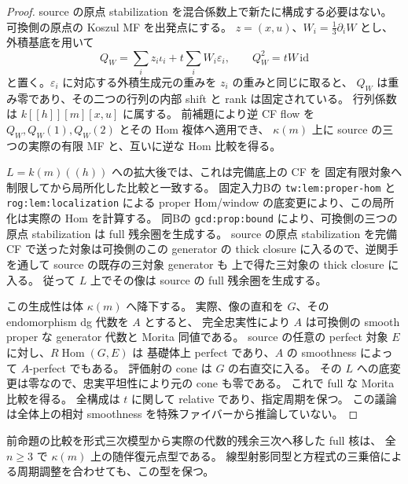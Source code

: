 \begin{proof}
source の原点 stabilization を混合係数上で新たに構成する必要はない。
可換側の原点の Koszul MF を出発点にする。
$z=(x,u)$、$W_i=\frac13\partial_iW$ とし、外積基底を用いて
\[
 Q_W=\sum_i z_i\iota_i+t\sum_i W_i\varepsilon_i,
 \qquad Q_W^2=tW\,\mathrm{id}
\]
と置く。$\varepsilon_i$ に対応する外積生成元の重みを $z_i$ の重みと同じに取ると、
$Q_W$ は重み零であり、その二つの行列の内部 shift と rank は固定されている。
行列係数は $k[[h]][m][x,u]$ に属する。
前補題により逆 CF flow を $Q_W,Q_W(1),Q_W(2)$ とその Hom 複体へ適用でき、
$\kappa(m)$ 上に source の三つの実際の有限 MF と、互いに逆な Hom 比較を得る。

$L=k(m)((h))$ への拡大後では、これは完備底上の CF を
固定有限対象へ制限してから局所化した比較と一致する。
固定入力Bの \texttt{tw:lem:proper-hom} と \texttt{rog:lem:localization} による
proper Hom/window の底変更により、この局所化は実際の Hom を計算する。
同Bの \texttt{gcd:prop:bound} により、可換側の三つの原点 stabilization は
full 残余圏を生成する。
source の原点 stabilization を完備 CF で送った対象は可換側のこの generator の
thick closure に入るので、逆関手を通して source の既存の三対象 generator も
上で得た三対象の thick closure に入る。
従って $L$ 上でその像は source の full 残余圏を生成する。

この生成性は体 $\kappa(m)$ へ降下する。
実際、像の直和を $G$、その endomorphism dg 代数を $A$ とすると、
完全忠実性により $A$ は可換側の smooth proper な generator 代数と Morita 同値である。
source の任意の perfect 対象 $E$ に対し、$R\operatorname{Hom}(G,E)$ は
基礎体上 perfect であり、$A$ の smoothness によって $A$-perfect でもある。
評価射の cone は $G$ の右直交に入る。
その $L$ への底変更は零なので、忠実平坦性により元の cone も零である。
これで full な Morita 比較を得る。
全構成は $t$ に関して relative であり、指定周期を保つ。
この議論は全体上の相対 smoothness を特殊ファイバーから推論していない。
\end{proof}

\begin{lemma}
\label{lem:nfm-period-mixed-comparison-adjoint-type}
前命題の比較を形式三次模型から実際の代数的残余三次へ移した full 核は、
全 $n\ge3$ で $\kappa(m)$ 上の随伴復元点型である。
線型射影同型と方程式の三乗倍による周期調整を合わせても、この型を保つ。
\end{lemma}

